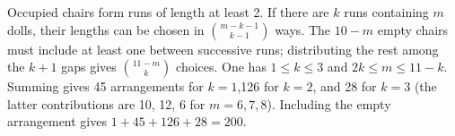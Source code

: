 Occupied chairs form runs of length at least 2. If there are $k$ runs containing $m$ dolls, their lengths can be chosen in $\binom{m-k-1}{k-1}$ ways. The $10-m$ empty chairs must include at least one between successive runs; distributing the rest among the $k+1$ gaps gives $\binom{11-m}{k}$ choices. One has $1\le k\le3$ and $2k\le m\le11-k$. Summing gives 45 arrangements for $k=1$,126 for $k=2$, and 28 for $k=3$ (the latter contributions are 10, 12, 6 for $m=6,7,8$). Including the empty arrangement gives $\boxed{1+45+126+28=200}$.
